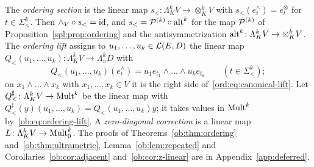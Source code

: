 The \emph{ordering section} is the linear map $s_<\colon\Lambda^k_KV\to\otimes^k_KV$ with $s_<(e^\wedge_t)=e^\otimes_t$ for
$t\in\Sigma^k_<$. Then $\wedge_V\circ s_<=\mathrm{id}$, and $s_<=\mathcal P^{(k)}\circ\operatorname{alt}^k$ for the map $\mathcal P^{(k)}$ of
Proposition~\ref{spl:prop:ordering} and the antisymmetrization $\operatorname{alt}^k\colon\Lambda^k_KV\to\otimes^k_KV$. The
\emph{ordering lift} assigns to $u_1,\dots,u_k\in\mathcal L(E,D)$ the linear map
$Q_<(u_1,\dots,u_k)\colon\Lambda^k_KV\to\Lambda^k_\pi D$ with
\begin{equation}\label{ob:eq:ordering-lift}
 Q_<(u_1,\dots,u_k)(e^\wedge_t)=u_1e_{t_1}\wedge\dots\wedge u_ke_{t_k}\qquad(t\in\Sigma^k_<);
\end{equation}
on $x_1\wedge\dots\wedge x_k$ with $x_1,\dots,x_k\in V$ it is the right side of~\eqref{ord:eq:canonical-lift}. Let
$Q^\sharp_<\colon\Lambda^k_KV\to\operatorname{Mult}^k$ be the linear map with $Q^\sharp_<(y)(u_1,\dots,u_k)=Q_<(u_1,\dots,u_k)y$; it takes
values in $\operatorname{Mult}^k$ by~\eqref{ob:eq:ordering-lift}. A \emph{zero-diagonal correction} is a linear map
$L\colon\Lambda^k_KV\to\operatorname{Mult}^k_0$. The proofs of Theorems~\ref{ob:thm:ordering} and~\ref{ob:thm:ultrametric},
Lemma~\ref{ob:lem:repeated} and Corollaries~\ref{ob:cor:adjacent} and~\ref{ob:cor:z-linear} are in
Appendix~\ref{app:deferred}.

